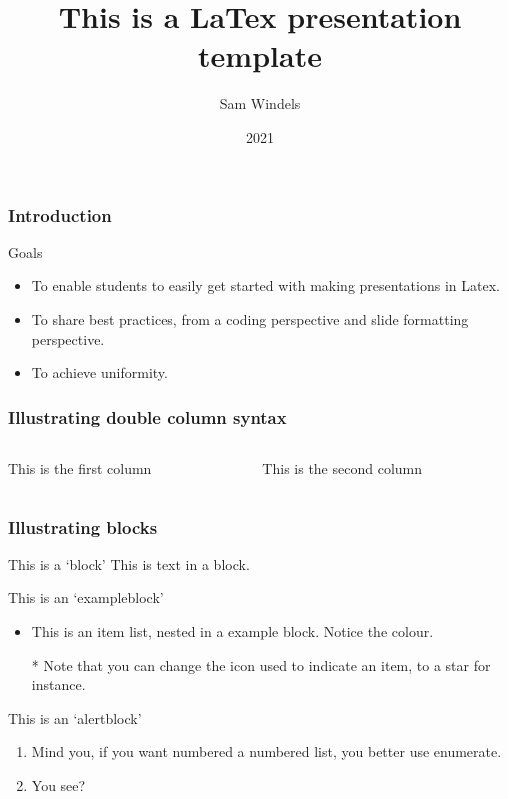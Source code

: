 \documentclass[aspectratio=169]{beamer} %
\title{This is a LaTex presentation template }
\author{Sam Windels}
\institute{Barcelona Supercomputing Centre}
\date{2021}
\begin{document}
{
\begin{frame}
  \titlepage
\end{frame}
}
\addtocounter{framenumber}{-1} %

\begin{frame}
\frametitle{Introduction}

\begin{block}{Goals}
	\begin{itemize}
		\item To enable students to easily get started with making presentations in Latex.
		\item To share best practices, from a coding perspective and slide formatting perspective.
		\item To achieve uniformity.
	\end{itemize} 
\end{block}

\end{frame}

\begin{frame}[t]
	\frametitle{Illustrating double column syntax}
	\begin{columns}
		\begin{column}{0.5\textwidth}
			This is the first column
		\end{column}
		\begin{column}{0.5\textwidth}
			This is the second column
		\end{column}
	\end{columns}
\end{frame}

\begin{frame}[t]
	\frametitle{Illustrating blocks}

	\begin{block}{This is a `block'}
		This is text in a block.
	\end{block}

	\begin{exampleblock}{This is an `exampleblock'}
		\begin{itemize}
			\item This is an item list, nested in a example block. Notice the colour.
			\item[*] Note that you can change the icon used to indicate an item, to a star for instance.
		\end{itemize}		
	\end{exampleblock}
	
	\begin{alertblock}{This is an `alertblock'}
		\begin{enumerate}
			\item Mind you, if you want numbered a numbered list, you better use enumerate.
			\item You see?
		\end{enumerate}
	\end{alertblock}
	
\end{frame}
\end{document}
